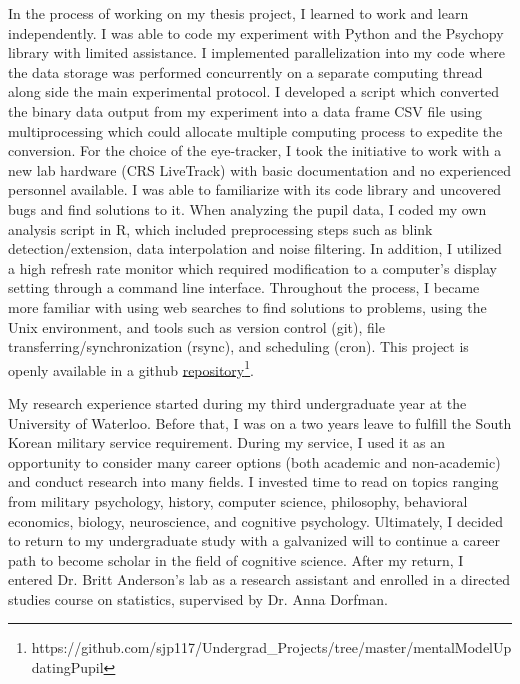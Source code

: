 \documentclass[12pt]{article}
\begin{document}
	In the process of working on my thesis project, I learned to work and learn independently. I was able to code my experiment with Python and the Psychopy library with limited assistance. I implemented parallelization into my code where the data storage was performed concurrently on a separate computing thread along side the main experimental protocol. I developed a script which converted the binary data output from my experiment into a data frame CSV file using multiprocessing which could allocate multiple computing process to expedite the conversion. For the choice of the eye-tracker, I took the initiative to work with a new lab hardware (CRS LiveTrack) with basic documentation and no experienced personnel available. I was able to familiarize with its code library and uncovered bugs and find solutions to it. When analyzing the pupil data, I coded my own analysis script in R, which included preprocessing steps such as blink detection/extension, data interpolation and noise filtering. In addition, I utilized a high refresh rate monitor which required modification to a computer’s display setting through a command line interface. Throughout the process, I became more familiar with using web searches to find solutions to problems, using the Unix environment, and tools such as version control (git), file transferring/synchronization (rsync), and scheduling (cron). This project is openly available in a github \href{https://github.com/sjp117/Undergrad_Projects/tree/master/mentalModelUpdatingPupil}{repository}\footnote{https://github.com/sjp117/Undergrad\_Projects/tree/master/mentalModelUpdatingPupil}.
	
	My research experience started during my third undergraduate year at the University of Waterloo. Before that, I was on a two years leave to fulfill the South Korean military service requirement. During my service, I used it as an opportunity to consider many career options (both academic and non-academic) and conduct research into many fields. I invested time to read on topics ranging from military psychology, history, computer science, philosophy, behavioral economics, biology, neuroscience, and cognitive psychology. Ultimately, I decided to return to my undergraduate study with a galvanized will to continue a career path to become scholar in the field of cognitive science. After my return, I entered Dr. Britt Anderson's lab as a research assistant and enrolled in a directed studies course on statistics, supervised by Dr. Anna Dorfman.
	
\end{document}
